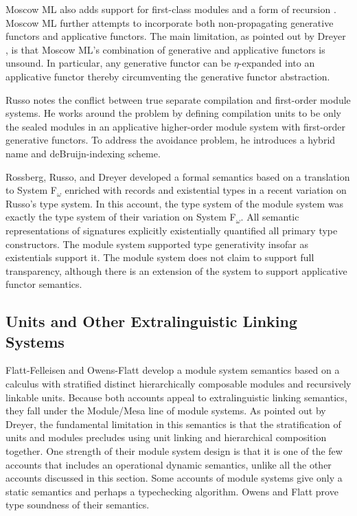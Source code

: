 Moscow ML also adds support for first-class
modules\cite{russo00} and a form of recursion \cite{russo01}. Moscow ML further attempts to incorporate both non-propagating
generative functors and applicative functors. The main limitation, as pointed out by Dreyer \cite{dreyerthesis}, is that Moscow ML's combination of generative and applicative functors is unsound. In particular, any generative functor can be $\eta$-expanded into an applicative functor thereby circumventing the generative functor abstraction. 

Russo notes the conflict between true separate compilation and
first-order module systems. He works around the problem by defining
compilation units to be only the sealed modules in an applicative
higher-order module system with first-order generative functors. To
address the avoidance problem, he introduces a hybrid name and
deBruijn-indexing scheme. 

Rossberg, Russo, and Dreyer \cite{tldi2010} developed a formal semantics based on a
translation to System F$_\omega$ enriched with records and existential
types in a recent variation on Russo's type system. In
this account, the type system of the module system was exactly the
type system of their variation on System F$_\omega$. All semantic
representations of signatures explicitly existentially quantified all
primary type constructors. The module system supported type
generativity insofar as existentials support it. The module system
does not claim to support full transparency, although there is an
extension of the system to support applicative functor semantics. 


\subsection{Units and Other Extralinguistic Linking Systems}
Flatt-Felleisen \cite{ff98} and Owens-Flatt \cite{owensflatt06} develop a module system semantics based on a calculus with stratified distinct hierarchically composable modules and recursively linkable units. Because both accounts appeal to extralinguistic linking semantics, they fall under the Module/Mesa line of module systems. As pointed out by Dreyer\cite{mixml}, the fundamental limitation in this semantics is that the stratification of units and modules precludes using unit linking and hierarchical composition together. One strength of their module system design is that it is one of the few accounts that includes an operational dynamic semantics, unlike all the other accounts discussed in this section. Some accounts of module systems give only a static semantics and perhaps a typechecking algorithm. Owens and Flatt prove type soundness of their semantics. 

